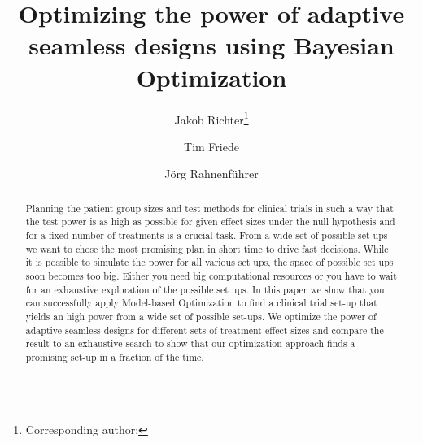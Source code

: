 \documentclass[bimj,fleqn]{w-art}
\theoremstyle{plain}
\theoremstyle{definition}
\begin{document}

\title[Model-based Optimization of Adaptive Seamless Designs]{Optimizing the power of adaptive seamless designs using Bayesian Optimization} %
\author[Jakob Richter {\it{et al.}}]{Jakob Richter\footnote{Corresponding author: {}}} 
\address[\inst{1}]{Fakultät Statistik, Technische Universität Dortmund, 44221 Dortmund}
\author[dd]{Tim Friede}
\address[\inst{2}]{Second address} %
\author[]{Jörg Rahnenführer} %
   

\begin{abstract}
Planning the patient group sizes and test methods for clinical trials in such a way that the test power is as high as possible for given effect sizes under the null hypothesis and for a fixed number of treatments is a crucial task.
From a wide set of possible set ups we want to chose the most promising plan in short time to drive fast decisions.
While it is possible to simulate the power for all various set ups, the space of possible set ups soon becomes too big.
Either you need big computational resources or you have to wait for an exhaustive exploration of the possible set ups.
In this paper we show that you can successfully apply Model-based Optimization to find a clinical trial set-up that yields an high power from a wide set of possible set-ups.
We optimize the power of adaptive seamless designs for different sets of treatment effect sizes and compare the result to an exhaustive search to show that our optimization approach finds a promising set-up in a fraction of the time.
\end{abstract}
\end{document}
